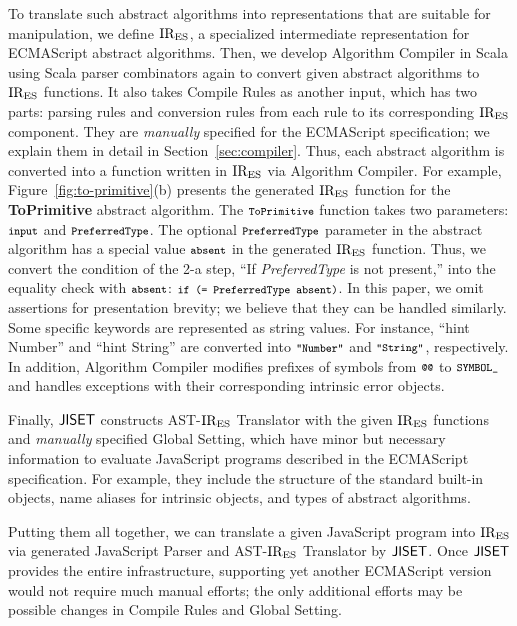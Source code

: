 To translate such abstract algorithms into representations that are
suitable for manipulation, we define \( \text{IR}_\text{ES} \), a specialized
intermediate representation for ECMAScript abstract algorithms.  Then,
we develop \textsf{Algorithm Compiler} in Scala using Scala parser
combinators again to convert given abstract algorithms to \( \text{IR}_\text{ES} \)
functions.  It also takes \textsf{Compile Rules} as another input,
which has two parts: parsing rules and conversion rules from each rule to its
corresponding \( \text{IR}_\text{ES} \) component.  They are \textit{manually} specified for
the ECMAScript specification; we explain them in detail in
Section~\ref{sec:compiler}.  Thus, each abstract algorithm is
converted into a function written in \( \text{IR}_\text{ES} \) via \textsf{Algorithm Compiler}.
For example, Figure~\ref{fig:to-primitive}(b) presents the generated
\( \text{IR}_\text{ES} \) function for the \textbf{ToPrimitive} abstract algorithm.
The \( \texttt{\footnotesize ToPrimitive} \) function takes two parameters:
\( \texttt{\footnotesize input} \) and \( \texttt{\footnotesize PreferredType} \).  The optional
\( \texttt{\footnotesize PreferredType} \) parameter in the abstract algorithm has
a special value \( \texttt{\footnotesize absent} \) in the generated \( \text{IR}_\text{ES} \) function.
Thus, we convert the condition of the 2-a step,
``If \textit{PreferredType} is not present,'' into the equality check
with \( \texttt{\footnotesize absent} \): \( \texttt{\footnotesize if (= PreferredType absent)} \).
In this paper, we omit assertions for presentation brevity; we believe
that they can be handled similarly.  Some specific keywords are
represented as string values.  For instance, ``hint Number'' and
``hint String'' are converted into \( \texttt{\footnotesize"Number"} \) and
\( \texttt{\footnotesize"String"} \), respectively.  In addition,
\textsf{Algorithm Compiler} modifies prefixes of symbols from
\( \code{@@} \) to \( \texttt{\footnotesize SYMBOL\_} \) and handles exceptions with
their corresponding intrinsic error objects.

Finally, \( \text{\sf JISET} \) constructs {\sf AST-\( \text{IR}_\text{ES} \) Translator} with
the given \( \text{IR}_\text{ES} \) functions and \textit{manually} specified
{\sf Global Setting}, which have minor but necessary information to
evaluate JavaScript programs described in the ECMAScript specification.
For example, they include the structure of the standard built-in
objects, name aliases for intrinsic objects, and types of abstract
algorithms.

Putting them all together, we can translate a given JavaScript program
into \( \text{IR}_\text{ES} \) via generated {\sf JavaScript Parser} and
{\sf AST-\( \text{IR}_\text{ES} \) Translator} by \( \text{\sf JISET} \).
Once \( \text{\sf JISET} \) provides the entire infrastructure, supporting yet
another ECMAScript version would not require much manual efforts;
the only additional efforts may be possible changes in \textsf{Compile Rules}
and {\sf Global Setting}.

